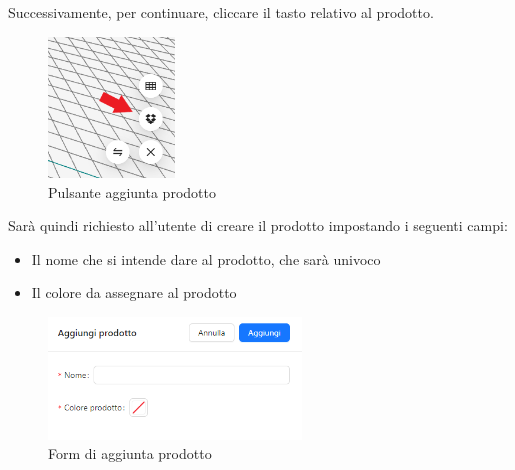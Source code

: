         \noindent Successivamente, per continuare, cliccare il tasto relativo al prodotto.\\
        \begin{figure}[h!]
            \centering
            \includegraphics[width=0.3\textwidth]{images/aggiunta_prodotto.png}
            \caption{Pulsante aggiunta prodotto}
        \end{figure}


        \noindent Sarà quindi richiesto all'utente di creare il prodotto impostando i seguenti campi:
        \begin{itemize}
            \item Il nome che si intende dare al prodotto, che sarà univoco
            \item Il colore da assegnare al prodotto
        \end{itemize}
        
        \begin{figure}[h!]
            \centering
            \includegraphics[width=0.6\textwidth]{images/creazione_prodotto.png}
            \caption{Form di aggiunta prodotto}
        \end{figure}

